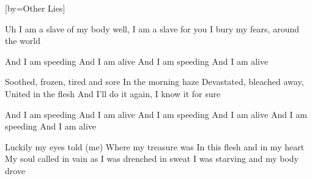 [by={Other Lies}]



  \chordsoff
  \beginverse
  Uh I am a slave of my body well,
  I am a slave for you
  I bury my fears, around the world
  \endverse

  \beginchorus
  And I am speeding And I am alive
  And I am speeding And I am alive
  \endchorus

  \beginverse
  Soothed, frozen, tired and sore
  In the morning haze
  Devastated, bleached away,
  United in the flesh  
  And I’ll do it again,
  I know it for sure
  \endverse
  
  \beginchorus
  And I am speeding And I am alive
  And I am speeding And I am alive
  And I am speeding And I am alive
  \endchorus

  
  \beginverse
  Luckily my eyes told (me)
  Where my treasure was
  In this flesh and in my heart
  My soul called in vain  
  as I was drenched in sweat
  I was starving and my body drove
  \endverse

  
\endsong
